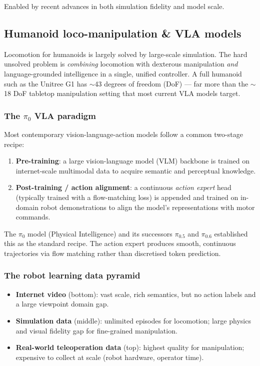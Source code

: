 Enabled by recent advances in both simulation fidelity and model scale.

\subsection{Humanoid loco-manipulation \& VLA models}

\begin{intuitionbox}
Locomotion for humanoids is largely solved by large-scale simulation. The hard unsolved problem is \emph{combining} locomotion with dexterous manipulation \emph{and} language-grounded intelligence in a single, unified controller. A full humanoid such as the Unitree G1 has $\sim$43 degrees of freedom (DoF) — far more than the $\sim$18 DoF tabletop manipulation setting that most current VLA models target.
\end{intuitionbox}

\subsubsection{The $\pi_0$ VLA paradigm}

Most contemporary vision-language-action models follow a common two-stage recipe:
\begin{enumerate}
  \item \textbf{Pre-training}: a large vision-language model (VLM) backbone is trained on internet-scale multimodal data to acquire semantic and perceptual knowledge.
  \item \textbf{Post-training / action alignment}: a continuous \emph{action expert} head (typically trained with a flow-matching loss) is appended and trained on in-domain robot demonstrations to align the model's representations with motor commands.
\end{enumerate}
The $\pi_0$ model (Physical Intelligence) and its successors $\pi_{0.5}$ and $\pi_{0.6}$ established this as the standard recipe. The action expert produces smooth, continuous trajectories via flow matching rather than discretised token prediction.

\subsubsection{The robot learning data pyramid}

\begin{itemize}
  \item \textbf{Internet video} (bottom): vast scale, rich semantics, but no action labels and a large viewpoint domain gap.
  \item \textbf{Simulation data} (middle): unlimited episodes for locomotion; large physics and visual fidelity gap for fine-grained manipulation.
  \item \textbf{Real-world teleoperation data} (top): highest quality for manipulation; expensive to collect at scale (robot hardware, operator time).
\end{itemize}

